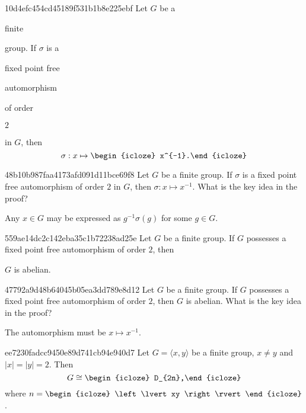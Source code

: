 \begin{note}{10d4efc454cd45189f531b1b8e225ebf}
    Let \({ G }\) be a \begin{icloze}{4}finite\end{icloze} group.
    If \({ \sigma }\) is a \begin{icloze}{3}fixed point free\end{icloze} \begin{icloze}{5}automorphism\end{icloze} of order \begin{icloze}{2}\({ 2 }\)\end{icloze} in \({ G }\), then
    \[
        \sigma : x \mapsto \begin{icloze}{1}x^{-1}.\end{icloze}
    \]
\end{note}

\begin{note}{48b10b987faa4173afd091d11bce69f8}
    Let \({ G }\) be a finite group.
    If \({ \sigma }\) is a fixed point free automorphism of order \({ 2 }\) in \({ G }\), then \({ \sigma : x \mapsto x^{-1} }\).
    What is the key idea in the proof?

    \begin{cloze}{1}
        Any \({ x \in G }\) may be expressed as \({ g^{-1} \sigma(g) }\) for some \({ g \in G }\).
    \end{cloze}
\end{note}

\begin{note}{559ae14dc2c142eba35c1b72238ad25e}
    Let \({ G }\) be a finite group.
    If \({ G }\) possesses a fixed point free automorphism of order \({ 2 }\), then \begin{icloze}{1}\({ G }\) is abelian.\end{icloze}
\end{note}

\begin{note}{47792a9d48b64045b05ea3dd789e8d12}
    Let \({ G }\) be a finite group.
    If \({ G }\) possesses a fixed point free automorphism of order \({ 2 }\), then \({ G }\) is abelian.
    What is the key idea in the proof?

    \begin{cloze}{1}
        The automorphism must be \({ x \mapsto x^{-1} }\).
    \end{cloze}
\end{note}

\begin{note}{ee7230fadcc9450e89d741cb94e940d7}
    Let \({ G = \langle x, y \rangle }\) be a finite group, \({ x \neq y }\) and \({ \left\lvert x \right\rvert = \left\lvert y \right\rvert = 2 }\).
    Then
    \[
        G \cong \begin{icloze}{1}D_{2n},\end{icloze}
    \]
    where \({ n = \begin{icloze}{2}\left\lvert xy \right\rvert\end{icloze} }\).
\end{note}

